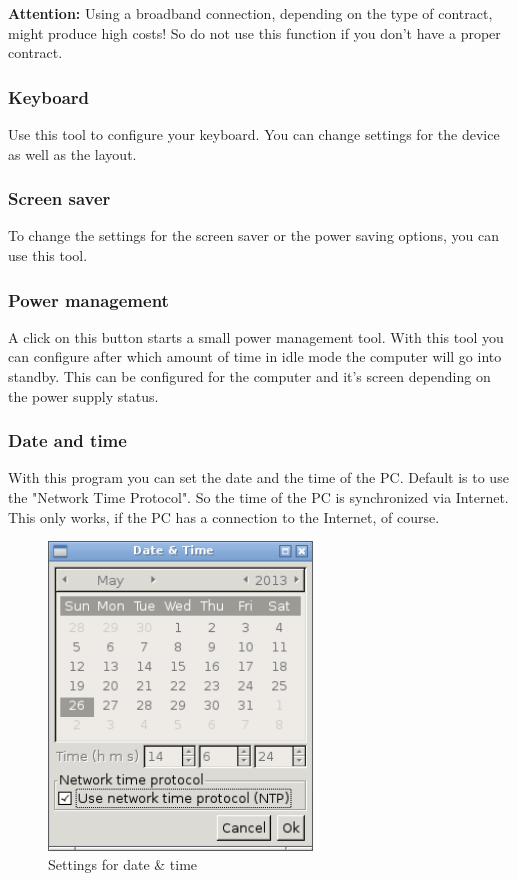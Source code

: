 \documentclass[a4paper,12pt,twoside]{article}
\begin{document}
\bigskip
\textbf{Attention:} Using a broadband connection, depending on the type of
contract, might produce high costs! So do not use this function if you
don't have a proper contract.
\bigskip

\subsubsection{Keyboard}
\label{sct:keyboard}
Use this tool to configure your keyboard. You can change settings for
the device as well as the layout.


\subsubsection{Screen saver}
\label{sct:screen_saver}
To change the settings for the screen saver or the power saving options,
you can use this tool.


\subsubsection{Power management}
\label{sct:power_management}
A click on this button starts a small power management tool. With this tool
you can configure after which amount of time in idle mode the computer will 
go into standby. This can be configured for the computer and it's screen 
depending on the power supply status.


\subsubsection{Date and time}
\label{sct:date_time}
With this program you can set the date and the time of the PC. Default
is to use the "Network Time Protocol". So
the time of the PC is synchronized via Internet. This only works, if
the PC has a connection to the Internet, of course.

\begin{figure}
    \centering
    \includegraphics[width=7cm]{efaLiveen-img/efaLiveen-img26.png}
    \caption{Settings for date \& time}
    \label{fig:date_time}
\end{figure}
\end{document}
